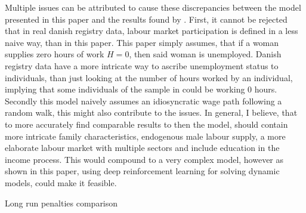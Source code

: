 Multiple issues can be attributed to cause these discrepancies between the model presented in this paper and the results found by \textcite{kleven_children_2019}. First, it cannot be rejected that in real danish registry data, labour market participation is defined in a less naive way, than in this paper. This paper simply assumes, that if a woman supplies zero hours of work $H=0$, then said woman is unemployed. Danish registry data have a more intricate way to ascribe unemployment status to individuals, than just looking at the number of hours worked by an individual, implying that some individuals of the sample in \textcite{kleven_children_2019} could be working 0 hours. Secondly this model naively assumes an idiosyncratic wage path following a random walk, this might also contribute to the issues. In general, I believe, that to more accurately find comparable results to \textcite{kleven_children_2019} then the model, should contain more intricate family characteristics, endogenous male labour supply, a more elaborate labour market with multiple sectors and include education in the income process. This would compound to a very complex model, however as shown in this paper, using deep reinforcement learning for solving dynamic models, could make it feasible.

\begin{table}[ht]
    \centering
    
    \caption{Long run penalties comparison}
    \label{tab:extended_results}
\end{table}




